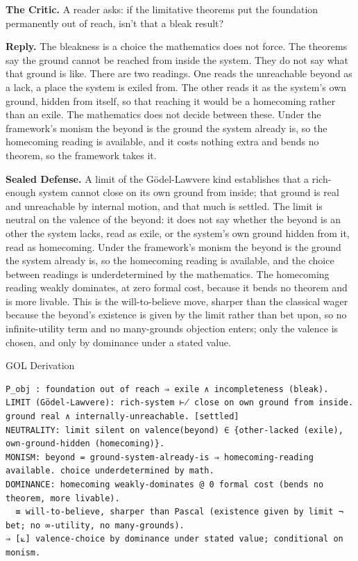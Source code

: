 \documentclass[10pt,twocolumn]{article}
\begin{document}
\textbf{The Critic.} A reader asks: if the limitative theorems put the
foundation permanently out of reach, isn't that a bleak result?

\textbf{Reply.} The bleakness is a choice the mathematics does not
force. The theorems say the ground cannot be reached from inside the
system. They do not say what that ground is like. There are two
readings. One reads the unreachable beyond as a lack, a place the system
is exiled from. The other reads it as the system's own ground, hidden
from itself, so that reaching it would be a homecoming rather than an
exile. The mathematics does not decide between these. Under the
framework's monism the beyond is the ground the system already is, so
the homecoming reading is available, and it costs nothing extra and
bends no theorem, so the framework takes it.

\textbf{Sealed Defense.} A limit of the Gödel-Lawvere kind establishes
that a rich-enough system cannot close on its own ground from inside;
that ground is real and unreachable by internal motion, and that much is
settled. The limit is neutral on the valence of the beyond: it does not
say whether the beyond is an other the system lacks, read as exile, or
the system's own ground hidden from it, read as homecoming. Under the
framework's monism the beyond is the ground the system already is, so
the homecoming reading is available, and the choice between readings is
underdetermined by the mathematics. The homecoming reading weakly
dominates, at zero formal cost, because it bends no theorem and is more
livable. This is the will-to-believe move, sharper than the classical
wager because the beyond's existence is given by the limit rather than
bet upon, so no infinite-utility term and no many-grounds objection
enters; only the valence is chosen, and only by dominance under a stated
value.

\begin{golbox}{GOL Derivation}
\begin{lstlisting}[style=golv]
P_obj : foundation out of reach ⇒ exile ∧ incompleteness (bleak).
LIMIT (Gödel-Lawvere): rich-system ⊬ close on own ground from inside. ground real ∧ internally-unreachable. [settled]
NEUTRALITY: limit silent on valence(beyond) ∈ {other-lacked (exile), own-ground-hidden (homecoming)}.
MONISM: beyond = ground-system-already-is ⇒ homecoming-reading available. choice underdetermined by math.
DOMINANCE: homecoming weakly-dominates @ 0 formal cost (bends no theorem, more livable).
  ≡ will-to-believe, sharper than Pascal (existence given by limit ¬ bet; no ∞-utility, no many-grounds).
⇒ [⟀] valence-choice by dominance under stated value; conditional on monism.
\end{lstlisting}
\end{golbox}
\end{document}
